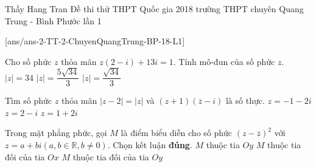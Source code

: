 	\begin{name}
		{Thầy Hang Tran}
		{Đề thi thử THPT Quốc gia 2018 trường THPT chuyên Quang Trung - Bình Phước lần 1}
	\end{name}
	\setcounter{ex}{0}
	[ans/ans-2-TT-2-ChuyenQuangTrung-BP-18-L1]

	\begin{ex} %
	Cho số phức $z$ thỏa mãn $z(2 - i) + 13i = 1$. Tính mô-đun của số phức $z$.	
			{$|z| = 34$}	{$|z| = \dfrac{5\sqrt{34}}{3}$}	{$|z| = \dfrac{\sqrt{34}}{3}$}
	
	\end{ex}
				
	\begin{ex} %
	Tìm số phức $z$ thỏa mãn $|z - 2| = |z|$ và $(z + 1)(\overline{z} - i)$ là số thực.	
			{$z = -1 - 2i$}	{$z = 2-i$}	{$z = 1 + 2i$}

	\end{ex}
				
	\begin{ex} %
	Trong mặt phẳng phức, gọi $M$ là điểm biểu diễn cho số phức $(z - \overline{z})^2$ với $z = a + bi (a, b \in \mathbb{R}, b \ne 0)$. Chọn kết luận \textbf{đúng}.	
			{$M$ thuộc tia $Oy$}	{\True $M$ thuộc tia đối của tia $Ox$}	{$M$ thuộc tia đối của tia $Oy$}
	
	\end{ex}
					
